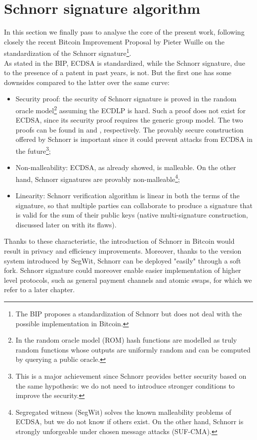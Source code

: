\section{Schnorr signature algorithm}
\label{schnorr}
In this section we finally pass to analyse the core of the present work, following closely the recent Bitcoin Improvement Proposal by Pieter Wuille \cite{RefWork:5} on the standardization of the Schnorr signature\footnote{The BIP proposes a standardization of Schnorr but does not deal with the possible implementation in Bitcoin.}.
\\
As stated in the BIP, ECDSA is standardized, while the Schnorr signature, due to the presence of a patent in past years, is not. But the first one has some downsides compared to the latter over the same curve:
\begin{itemize}
	\item Security proof: the security of Schnorr signature is proved in the random oracle model\footnote{In the random oracle model (ROM) hash functions are modelled as truly random functions whose outputs are uniformly random and can be computed by querying a public oracle.} assuming the ECDLP is hard. Such a proof does not exist for ECDSA, since its security proof requires the generic group model. The two proofs can be found in \cite{RefWork:8} and \cite{RefWork:9}, respectively. The provably secure construction offered by Schnorr is important since it could prevent attacks from ECDSA in the future\footnote{This is a major achievement since Schnorr provides better security based on the same hypothesis: we do not need to introduce stronger conditions to improve the security.};
	\item Non-malleability: ECDSA, as already showed, is malleable. On the other hand, Schnorr signatures are provably non-malleable\footnote{Segregated witness (SegWit) solves the known malleability problems of ECDSA, but we do not know if others exist. On the other hand, Schnorr is strongly unforgeable under chosen message attacks (SUF-CMA).};
	\item Linearity: Schnorr verification algorithm is linear in both the terms of the signature, so that multiple parties can collaborate to produce a signature that is valid for the sum of their public keys (native multi-signature construction, discussed later on with its flaws).
\end{itemize}
Thanks to these characteristic, the introduction of Schnorr in Bitcoin would result in privacy and efficiency improvements. Moreover, thanks to the version system introduced by SegWit, Schnorr can be deployed "easily" through a soft fork. Schnorr signature could moreover enable easier implementation of higher level protocols, such as general payment channels and atomic swaps, for which we refer to a later chapter.

